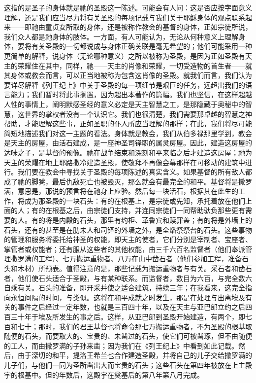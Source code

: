 这指的是圣子的身体就是祂的圣殿这一陈述。可能会有人问：这是否应按字面意义理解，还是我们应当尽力将有关圣殿的每项记载与我们关于耶稣身体的观点联系起来——即祂由童贞女所取的身体，还是被称作教会的基督的身体，正如宗徒所说，我们众人都是祂身体的肢体。一方面，有人可能认为，无论从何种意义上理解身体，要将有关圣殿的一切都说成与身体正确关联是毫无希望的；他们可能采用一种更简单的解释，说身体（无论哪种意义）之所以被称为圣殿，是因为正如圣殿有天主的荣耀住在其中，同样，祂——天主的肖像和荣耀，一切受造物的首生者——就其身体或教会而言，可以正当地被称为包含这肖像的圣殿。就我们而言，我们认为要详尽解释《列王纪上》中关于圣殿的每一项细节是艰巨的任务，远超出我们的语言能力；我们暂时将此事搁置，因为超出本著作的篇幅。我们也坚信，在这样超越人性的事情上，阐明默感圣经的意义必定是天主智慧之工，是那隐藏于奥秘中的智慧，这世界的掌权者没有一个认识它。我们也很清楚，我们需要那卓越的智慧之神帮助，才能理解这些事，正如圣职的仆人所应当理解的那样；在此，我们将尽可能简短地描述我们对这一主题的看法。身体就是教会，我们从伯多禄那里学到，教会是天主的房屋，由活石建成，是一座神圣司铎职的属灵房屋。因此，建造这房屋的达味之子，是基督的预像。祂在战争结束和深刻和平来临之后才建造这房屋；祂为天主的荣耀在地上耶路撒冷建造圣殿，使敬拜不再像会幕那样在可移动的建筑中进行。我们要在教会中寻找关于圣殿的每项陈述的真实含义。如果基督的所有敌人都成了祂的脚凳，最后仇敌死亡也被毁灭，那么就会有最完全的和平。基督将是撒罗满，意思是，那说的预言将在祂身上应验。然后每一块活石，根据其在此生的工作，将成为那圣殿的一块石头：有的在根基上，是宗徒或先知，承托着放在他们上面的人；有的在根基之后，由宗徒们支持，并连同宗徒们一同帮助驮负那些更有需要的人。有的将是内殿的石头，那里有约柜、革鲁宾和赎罪盖；有的将是外墙上的石头，还有的甚至是在肋未人和司铎的外墙之外，是全燔祭祭台的石头。这些事物的管理和服务将委托给神圣的权能，即天主的使者，它们分别是宰制者、宝座者、掌管者或权能者；还有服从这些者的其他权能，由三千六百名监督者（他们奉派管理撒罗满的工程）、七万搬运重物者、八万在山中凿石者（他们参加工程，准备石头和木材）所预表。值得注意的是，那些记载为搬运重物者与有关。采石者和凿石者，他们使石头适合于圣殿，与有某种联系。而监督者，数目为六百，与完全数六自乘有关。石头的准备，即开采并使之适合建筑，持续三年；在我看来，这完全指向永恒间隔的时间，与类似。这将在和平成就之时发生，那是在处理与出离埃及有关的事件之后经过一定年数，也就是三百四十年，以及在天主与亚巴郎立约之后四百三十年于埃及所发生的事之后。这样，从亚巴郎到圣殿开始建造，有两个，即七百和七十；那时，我们的君王基督也将命令那七万搬运重物者，不为圣殿的根基取随便的石头，而要取大的、宝贵的、未凿过的石头，使它们可被凿琢，但不由随便的工人，而由撒罗满的子孙来凿；因为我们在《列王纪上》中看到如此记载。然后，由于深切的和平，提洛王希兰也合作建造圣殿，并将自己的儿子交给撒罗满的儿子们，与他们一同为圣所凿出大而宝贵的石头；这些石头在第四年被放在上主殿宇的根基中。但的年数后，这殿宇在奠基后的第八年第八月完成。\par


